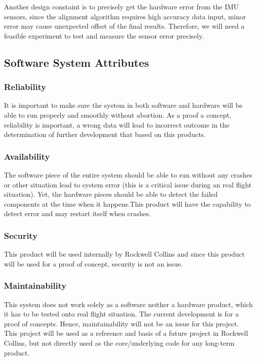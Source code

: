 Another design constaint is to precisely get the hardware error from the IMU sensors, since the alignment algorithm requires high accuracy data input, minor error may cause unexpected offset of the final results. Therefore, we will need a feasible experiment to test and measure the sensor error precisely.

\subsection{Software System Attributes}
\subsubsection{Reliability}
It is important to make sure the system in both software and hardware will be able to run properly and smoothly without abortion. As a proof a concept, reliability is important, a wrong data will lead to incorrect outcome in the determination of further development that based on this products.
\\
\subsubsection{Availability}
The software piece of the entire system should be able to run without any crashes or other situation lead to system error (this is a critical issue during an real flight situation). Yet, the hardware pieces should be able to detect the failed components at the time when it happens.This product will have the capability to detect error and may restart itself when crashes.
\\
\subsubsection{Security}
This product will be used internally by Rockwell Collins and since this product will be used for a proof of concept, security is not an issue.
\\
\subsubsection{Maintainability}
This system does not work solely as a software neither a hardware product, which it has to be tested onto real flight situation. The current development  is for a proof of concepts. Hence, maintainability will not be an issue for this project. This project will be used as a reference and basis of a future project in Rockwell Collins, but not directly used as the core/underlying code for any long-term product.
\\
